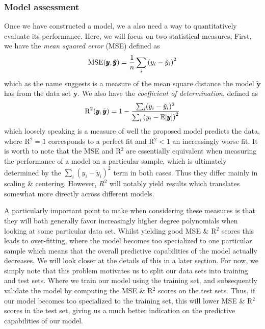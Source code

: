 \documentclass[reprint, english, nofootinbib]{revtex4-2}
\begin{document}
        \subsubsection{Model assessment}
            \noindent
            Once we have constructed a model, we a also need a way to quantitatively evaluate its performance. Here, we will focus on two statistical measures; First, we have the \textit{mean squared error} (MSE) defined as
            \begin{equation}
                \textup{MSE}(\pmb y, \pmb{\tilde y}) = \frac{1}{n}\sum_i \qty(y_i - \tilde y_i)^2
            \end{equation}
            which as the name suggests is a measure of the mean square distance the model $\pmb{\tilde y}$ has from the data set $\pmb y$. We also have the \textit{coefficient of determination}, defined as
            \begin{equation}
                \textup{R}^2(\pmb y, \tilde{\pmb{y}}) = 1 -
                \frac{\sum_i(y_i - \tilde y_i)^2}{\sum_i \qty(y_i - \mathbb E\qty[\pmb y])^2}
            \end{equation}
            which loosely speaking is a measure of well the proposed model predicts the data, where R$^2 = 1$ corresponds to a perfect fit and R$^2 < 1$ an increasingly worse fit. It is worth to note that the MSE and R$^2$ are essentially equivalent when measuring the performance of a model on a particular sample, which is ultimately determined by the $\sum_i(y_i - \tilde y_i)^2$ term in both cases. Thus they differ mainly in scaling \& centering. However, $R^2$ will notably yield results which translates somewhat more directly across different models.

            A particularly important point to make when considering these measures is that they will both generally favor increasingly higher degree polynomials when looking at some particular data set. Whilst yielding good MSE \& R$^2$ scores this leads to over-fitting, where the model becomes too specialized to one particular sample which means that the overall predictive capabilities of the model actually decreases. We will look closer at the details of this in a later section. For now, we simply note that this problem motivates us to split our data sets into training and test sets. Where we train our model using the training set, and subsequently validate the model by computing the MSE \& R$^2$ scores on the test sets. Thus, if our model becomes too specialized to the training set, this will lower MSE \& R$^2$ scores in the test set, giving us a much better indication on the predictive capabilities of our model.
\end{document}
